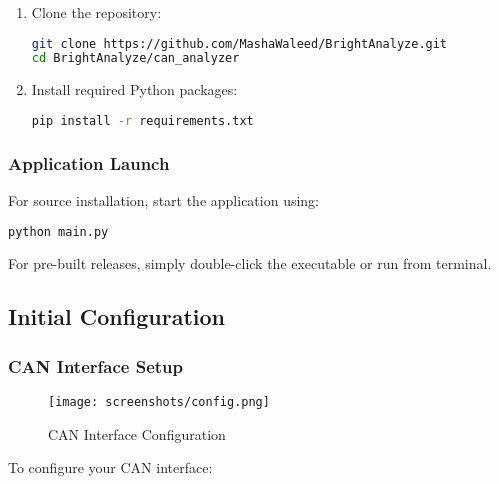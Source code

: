 \documentclass[11pt,a4paper]{article}
\begin{document}
\begin{enumerate}
    \item Clone the repository:
    \begin{lstlisting}[language=bash]
git clone https://github.com/MashaWaleed/BrightAnalyze.git
cd BrightAnalyze/can_analyzer
    \end{lstlisting}
    
    \item Install required Python packages:
    \begin{lstlisting}[language=bash]
pip install -r requirements.txt
    \end{lstlisting}
\end{enumerate}

\subsubsection{Application Launch}

For source installation, start the application using:

\begin{lstlisting}[language=bash]
python main.py
\end{lstlisting}

For pre-built releases, simply double-click the executable or run from terminal.

\subsection{Initial Configuration}

\subsubsection{CAN Interface Setup}

\begin{figure}[H]
    \centering
    \texttt{[image: screenshots/config.png]}
    \caption{CAN Interface Configuration}
    \label{fig:config}
\end{figure}

To configure your CAN interface:
\end{document}
